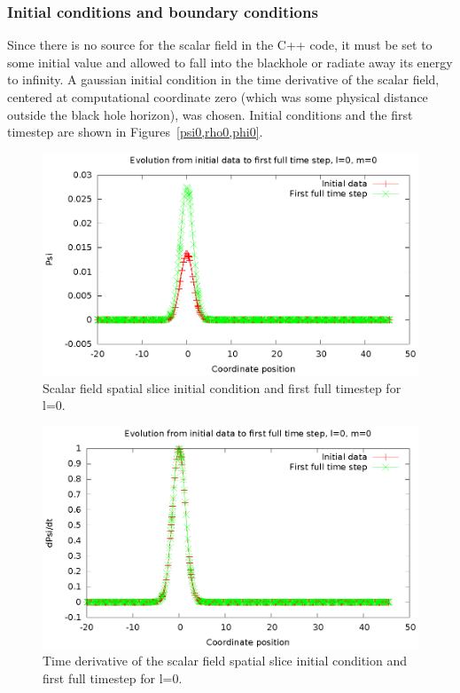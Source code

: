 \subsubsection{Initial conditions and boundary conditions}
Since there is no source for the scalar field in the C++ code, it must be set to some initial value and allowed to fall into the blackhole or radiate away its energy to infinity. A gaussian initial condition in the time derivative of the scalar field, centered at computational coordinate zero (which was some physical distance outside the black hole horizon), was chosen. Initial conditions and the first timestep are shown in Figures~\ref{psi0,rho0,phi0}.


\begin{figure}
  \includegraphics{psi1dl0}
  \caption{Scalar field spatial slice initial condition and first full timestep for l=0.}
\end{figure}

\begin{figure}
  \includegraphics{rho1dl0}
  \caption{Time derivative of the scalar field spatial slice initial condition and first full timestep for l=0.}
\end{figure}

